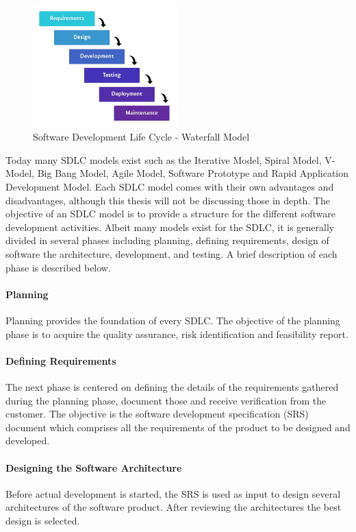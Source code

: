 \begin{figure}[!b]
    \centering
    \includegraphics[width=0.5\textwidth]{../../img/chapter_2/sdlc-waterfall.jpg}
    \caption{Software Development Life Cycle - Waterfall Model}
    \label{fig:sdlc-waterfall}
\end{figure}

Today many SDLC models exist such as the Iterative Model, Spiral Model, V-Model, Big Bang Model, Agile Model, Software Prototype and Rapid Application Development Model. Each SDLC model comes with their own advantages and disadvantages, although this thesis will not be discussing those in depth. The objective of an SDLC model is to provide a structure for the different software development activities.  Albeit many models exist for the SDLC, it is generally divided in several phases including planning, defining requirements, design of software the architecture, development, and testing. A brief description of each phase is described below.

\paragraph{Planning}
Planning provides the foundation of every SDLC. The objective of the planning phase is to acquire the quality assurance, risk identification and feasibility report. 

\paragraph{Defining Requirements}
The next phase is centered on defining the details of the requirements gathered during the planning phase, document those and receive verification from the customer. The objective is the software development specification (SRS) document which comprises all the requirements of the product to be designed and developed.

\paragraph{Designing the Software Architecture}
Before actual development is started, the SRS is used as input to design several architectures of the software product. After reviewing the architectures the best design is selected. 

